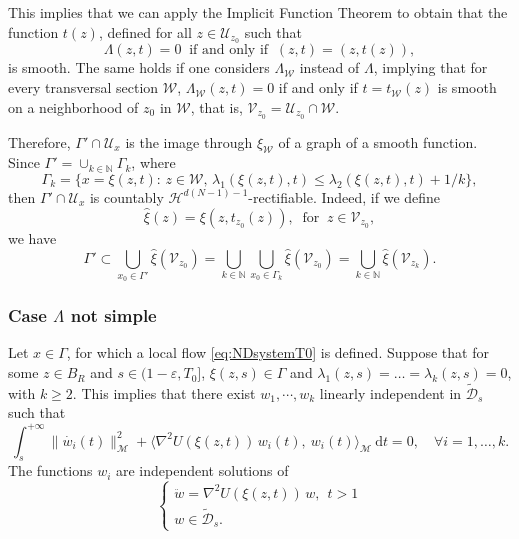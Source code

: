 \documentclass[a4paper,10pt]{amsart}
\newcommand{\ud}{\mathrm{d}}
\theoremstyle{plain}
\theoremstyle{definition}
\numberwithin{equation}{section}
\numberwithin{thm}{section}
\begin{document}
This implies that we can apply the Implicit Function Theorem to obtain that the function $t(z)$, defined for all $z \in \mathcal U_{z_0}$ such that
\[
\Lambda(z,t)=0 \ \mbox{ if and only if } \ (z,t)=(z,t(z)),
\]
is smooth. The same holds if one considers $\Lambda_\mathcal W$ instead of $\Lambda$, implying that for every transversal section $\mathcal W$, $\Lambda_\mathcal W(z,t) =0$ if and only if $t=t_\mathcal W(z)$ is smooth on a neighborhood of $z_0$ in $\mathcal W$, that is, $\mathcal V_{z_0}=\mathcal U_{z_0}\cap \mathcal W$.

Therefore, $\Gamma' \cap \mathcal{U}_x$ is the image through $\xi_\mathcal W$ of a graph of a smooth function.
Since $\Gamma' = \cup_{k \in \mathbb N} \Gamma_k$, where 
\begin{equation}
    \label{eq:gammaone}
\Gamma_k=\{x=\xi(z,t):\, z \in \mathcal W, \, \lambda_1(\xi(z,t),t) \le \lambda_2(\xi(z,t),t)+1/k\},
\end{equation}
 then  $\Gamma' \cap \mathcal{U}_x$ is countably $\mathcal{H}^{d(N-1)-1}$-rectifiable. Indeed, if we define
 \[
 \hat \xi(z)=\xi(z,t_{z_0}(z)), \ \mbox{ for } \ z \in \mathcal V_{z_0},
 \]
 we have
  \[
 \Gamma'\subset \bigcup_{x_0 \in \Gamma'} \hat\xi(\mathcal V_{z_0})=\bigcup_{k \in \mathbb N} \bigcup_{x_0 \in \Gamma_k} \hat\xi(\mathcal V_{z_0})=\bigcup_{k \in \mathbb N} \hat\xi(\mathcal V_{z_k}).
 \]



\subsubsection{Case $\Lambda$ not simple}
\label{ssec:multiple}

Let $x \in \Gamma$, for which a local flow \eqref{eq:NDsystemT0} is defined. Suppose that for some $z \in B_R$ and $s \in (1-\varepsilon,T_0]$, $\xi(z,s)\in \Gamma$ and  $\lambda_1(z,s)=\dots = \lambda_k(z,s)=0$, with $k \ge 2$. This implies that there exist $w_1, \cdots, w_k$ linearly independent in $\tilde{\mathcal D}_{s}$ such that 
\begin{equation}
    \label{eq:Hessian_zero}
\int_{s}^{+\infty}\|\dot{w_i}(t)\|_\mathcal{M}^2+\langle \nabla^2 U(\xi(z,t))\,w_i(t),\ w_i(t)\rangle_\mathcal{M}\ \ud t = 0,\quad \forall i=1,\dots, k.
\end{equation}
The functions $w_i$ are independent solutions of
\begin{equation}
    \begin{cases}
\label{eq:linearpb}
    \ddot w = \nabla^2U (\xi(z,t))\,w, \ \ t >1
    \\
    w\in \tilde{\mathcal D}_{s}.
\end{cases}
\end{equation}
\end{document}
